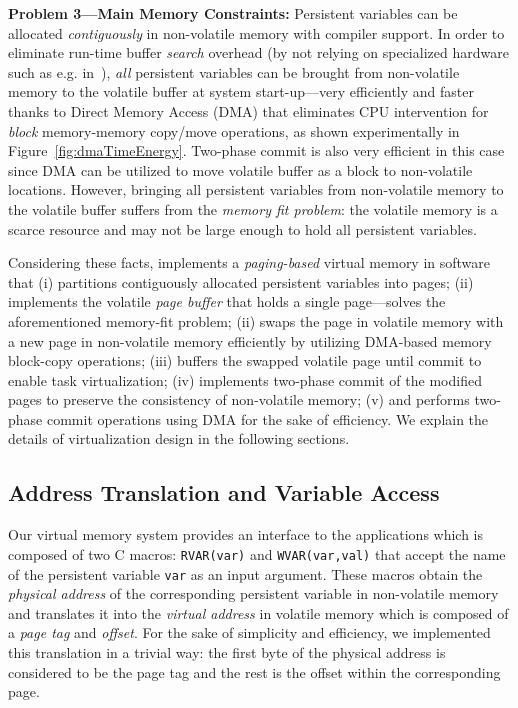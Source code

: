 \textbf{Problem 3---Main Memory Constraints:} Persistent variables can be allocated \emph{contiguously} in non-volatile memory with compiler support. In order to eliminate run-time buffer \emph{search} overhead (by not relying on specialized hardware such as e.g. in~\cite{hicks_isca_2017}), \emph{all} persistent variables can be brought from non-volatile memory to the volatile buffer at system start-up---very efficiently and faster thanks to Direct Memory Access (DMA) that eliminates CPU intervention for \emph{block} memory-memory copy/move operations, as shown experimentally in Figure~\ref{fig:dmaTimeEnergy}. Two-phase commit is also very efficient in this case since DMA can be utilized to move volatile buffer as a block to non-volatile locations. However, bringing all persistent variables from non-volatile memory to the volatile buffer suffers from the \emph{memory fit problem}: the volatile memory is a scarce resource and may not be large enough to hold all persistent variables.

Considering these facts, \sys implements a \emph{paging-based} virtual memory in software that (i) partitions contiguously allocated persistent variables into pages; (ii) implements the volatile \emph{page buffer} that holds a single page---solves the aforementioned memory-fit problem; (ii) swaps the page in volatile memory with a new page in non-volatile memory efficiently by utilizing DMA-based memory block-copy operations; (iii) buffers the swapped volatile page until commit to enable task virtualization; (iv) implements two-phase commit of the modified pages to preserve the consistency of non-volatile memory; (v) and performs two-phase commit operations using DMA for the sake of efficiency. We explain the details of \sys virtualization design in the following sections.

\subsection{Address Translation and Variable Access}

Our virtual memory system provides an interface to the applications which is composed of two C macros: \texttt{RVAR(var)} and \texttt{WVAR(var,val)} that accept the name of the persistent variable \texttt{var} as an input argument. These macros obtain the \emph{physical address} of the corresponding persistent variable in non-volatile memory and translates it into the \emph{virtual address} in volatile memory which is composed of a \emph{page tag} and \emph{offset}. For the sake of simplicity and efficiency, we implemented this translation in a trivial way: the first byte of the physical address is considered to be the page tag and the rest is the offset within the corresponding page. 

